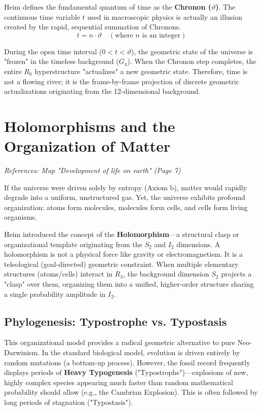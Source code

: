 \documentclass[11pt,a4paper,oneside]{article}
\begin{document}
Heim defines the fundamental quantum of time as the \textbf{Chronon ($\vartheta$)}. The continuous time variable $t$ used in macroscopic physics is actually an illusion created by the rapid, sequential summation of Chronons. 
\begin{equation}
    t = n \cdot \vartheta \quad (\text{where } n \text{ is an integer})
\end{equation}

During the open time interval ($0 < t < \vartheta$), the geometric state of the universe is "frozen" in the timeless background ($G_4$). When the Chronon step completes, the entire $R_6$ hyperstructure "actualizes" a new geometric state. Therefore, time is not a flowing river; it is the frame-by-frame projection of discrete geometric actualizations originating from the 12-dimensional background.

\section{Holomorphisms and the Organization of Matter}
\label{sec:holomorphism}

\textit{References: Map "Development of life on earth" (Page 7)}

If the universe were driven solely by entropy (Axiom b), matter would rapidly degrade into a uniform, unstructured gas. Yet, the universe exhibits profound organization: atoms form molecules, molecules form cells, and cells form living organisms. 

Heim introduced the concept of the \textbf{Holomorphism}—a structural clasp or organizational template originating from the $S_2$ and $I_2$ dimensions. A holomorphism is not a physical force like gravity or electromagnetism. It is a teleological (goal-directed) geometric constraint. When multiple elementary structures (atoms/cells) interact in $R_3$, the background dimension $S_2$ projects a "clasp" over them, organizing them into a unified, higher-order structure sharing a single probability amplitude in $I_2$.

\subsection{Phylogenesis: Typostrophe vs. Typostasis}

This organizational model provides a radical geometric alternative to pure Neo-Darwinism. In the standard biological model, evolution is driven entirely by random mutations (a bottom-up process). However, the fossil record frequently displays periods of \textbf{Heavy Typogenesis} ("Typostrophe")—explosions of new, highly complex species appearing much faster than random mathematical probability should allow (e.g., the Cambrian Explosion). This is often followed by long periods of stagnation ("Typostasis").
\end{document}
